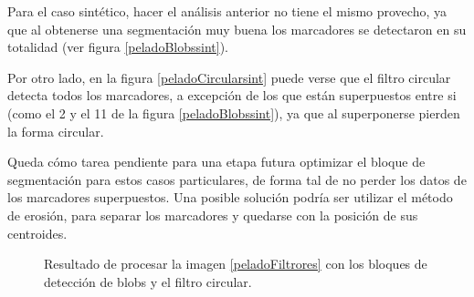 Para el caso sintético, hacer el análisis anterior no tiene el mismo provecho, ya que al obtenerse una segmentación muy buena los marcadores se detectaron en su totalidad (ver figura \ref{peladoBlobssint}). 

Por otro lado, en la figura \ref{peladoCircularsint} puede verse que el filtro circular detecta todos los marcadores, a excepción de los que están superpuestos entre si (como el 2 y el 11 de la figura \ref{peladoBlobssint}), ya que al superponerse pierden la forma circular.

 Queda cómo tarea pendiente para una etapa futura optimizar el bloque de segmentación para estos casos particulares, de forma tal de no perder los datos de los marcadores superpuestos. Una posible solución podría ser utilizar el método de erosión, para separar los marcadores y quedarse con la posición de sus centroides.

\begin{figure}[H]
        \hspace{-1cm}
         \hspace{1 mm}
  \caption{Resultado de procesar la imagen \ref{peladoFiltrores} con los bloques de detección de blobs y el filtro circular.}
      \label{detectMarcadoresSinteticos}
\end{figure}

